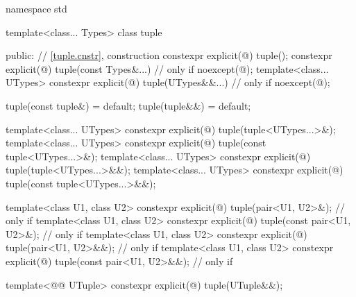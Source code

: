 %
\begin{codeblock}
namespace std {
  template<class... Types>
  class tuple {
  public:
    // \ref{tuple.cnstr},  construction
    constexpr explicit(@\seebelow@) tuple();
    constexpr explicit(@\seebelow@) tuple(const Types&...)          // only if 
      noexcept(@\seebelow@);
    template<class... UTypes>
      constexpr explicit(@\seebelow@) tuple(UTypes&&...)            // only if 
        noexcept(@\seebelow@);

    tuple(const tuple&) = default;
    tuple(tuple&&) = default;

    template<class... UTypes>
      constexpr explicit(@\seebelow@) tuple(tuple<UTypes...>&);
    template<class... UTypes>
      constexpr explicit(@\seebelow@) tuple(const tuple<UTypes...>&);
    template<class... UTypes>
      constexpr explicit(@\seebelow@) tuple(tuple<UTypes...>&&);
    template<class... UTypes>
      constexpr explicit(@\seebelow@) tuple(const tuple<UTypes...>&&);

    template<class U1, class U2>
      constexpr explicit(@\seebelow@) tuple(pair<U1, U2>&);         // only if 
    template<class U1, class U2>
      constexpr explicit(@\seebelow@) tuple(const pair<U1, U2>&);   // only if 
    template<class U1, class U2>
      constexpr explicit(@\seebelow@) tuple(pair<U1, U2>&&);        // only if 
    template<class U1, class U2>
      constexpr explicit(@\seebelow@) tuple(const pair<U1, U2>&&);  // only if 

    template<@@ UTuple>
      constexpr explicit(@\seebelow@) tuple(UTuple&&);

}}
\end{codeblock}
